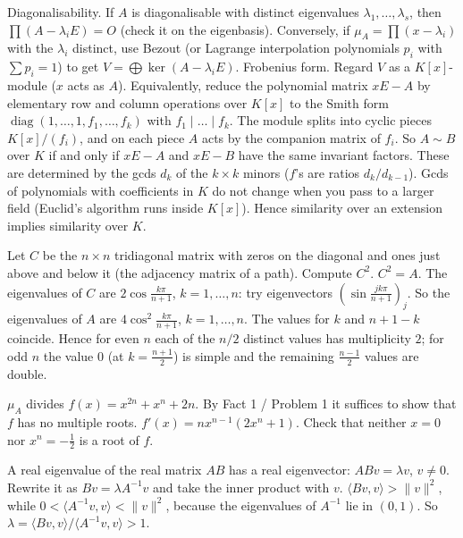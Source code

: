 \documentclass[11pt,a4paper]{article}
\begin{document}

Diagonalisability. If \(A\) is diagonalisable with distinct eigenvalues \(\lambda_1,\dots,\lambda_s\), then \(\prod(A-\lambda_iE)=O\) (check it on the eigenbasis). Conversely, if \(\mu_A=\prod(x-\lambda_i)\) with the \(\lambda_i\) distinct, use Bezout (or Lagrange interpolation polynomials \(p_i\) with \(\sum p_i=1\)) to get \(V=\bigoplus\ker(A-\lambda_iE)\).
Frobenius form. Regard \(V\) as a \(K[x]\)-module (\(x\) acts as \(A\)). Equivalently, reduce the polynomial matrix \(xE-A\) by elementary row and column operations over \(K[x]\) to the Smith form \(\operatorname{diag}(1,\dots,1,f_1,\dots,f_k)\) with \(f_1\mid\dots\mid f_k\). The module splits into cyclic pieces \(K[x]/(f_i)\), and on each piece \(A\) acts by the companion matrix of \(f_i\).
So \(A\sim B\) over \(K\) if and only if \(xE-A\) and \(xE-B\) have the same invariant factors. These are determined by the gcds \(d_k\) of the \(k\times k\) minors (\(f\)'s are ratios \(d_k/d_{k-1}\)). Gcds of polynomials with coefficients in \(K\) do not change when you pass to a larger field (Euclid's algorithm runs inside \(K[x]\)). Hence similarity over an extension implies similarity over \(K\).

Let \(C\) be the \(n\times n\) tridiagonal matrix with zeros on the diagonal and ones just above and below it (the adjacency matrix of a path). Compute \(C^2\).
\(C^2=A\). The eigenvalues of \(C\) are \(2\cos\frac{k\pi}{n+1}\), \(k=1,\dots,n\): try eigenvectors \((\sin\frac{jk\pi}{n+1})_j\).
So the eigenvalues of \(A\) are \(4\cos^2\frac{k\pi}{n+1}\), \(k=1,\dots,n\). The values for \(k\) and \(n+1-k\) coincide. Hence for even \(n\) each of the \(n/2\) distinct values has multiplicity \(2\); for odd \(n\) the value \(0\) (at \(k=\frac{n+1}2\)) is simple and the remaining \(\frac{n-1}2\) values are double.

\(\mu_A\) divides \(f(x)=x^{2n}+x^n+2n\). By Fact 1 / Problem 1 it suffices to show that \(f\) has no multiple roots.
\(f'(x)=nx^{n-1}(2x^n+1)\). Check that neither \(x=0\) nor \(x^n=-\frac12\) is a root of \(f\).

A real eigenvalue of the real matrix \(AB\) has a real eigenvector: \(ABv=\lambda v\), \(v\ne0\). Rewrite it as \(Bv=\lambda A^{-1}v\) and take the inner product with \(v\).
\(\langle Bv,v\rangle\gt\lVert v\rVert^2\), while \(0\lt\langle A^{-1}v,v\rangle\lt\lVert v\rVert^2\), because the eigenvalues of \(A^{-1}\) lie in \((0,1)\). So \(\lambda=\langle Bv,v\rangle/\langle A^{-1}v,v\rangle\gt1\).
\end{document}
